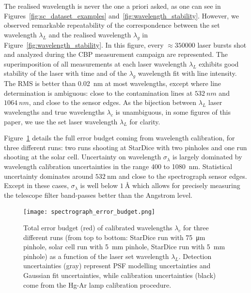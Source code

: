 The realised wavelength is never the one a priori asked, as one can see in Figures~\ref{fig:sc_dataset_examples} and~\ref{fig:wavelength_stability}. However, we observed remarkable repeatability of the correspondence between the set wavelength $\lambda_L$ and the realised wavelength $\lambda_g$ in Figure~\ref{fig:wavelength_stability}. In this figure, every $\approx\num{350000}$ laser bursts shot and analyzed during the CBP measurement campaign are represented. The superimposition of all measurements at each laser wavelength $\lambda_L$ exhibits good stability of the laser with time and of the $\lambda_g$ wavelength fit with line intensity. The RMS is better than \SI{0.02}{\nm} at most wavelengths, except where line determination is ambiguous: close to the contamination lines at $\SI{532}{nm}$ and $\SI{1064}{nm}$, and close to the sensor edges. As the bijection between $\lambda_L$ laser wavelengths and true wavelengths $\lambda_c$ is unambiguous, in some figures of this paper, we use the set laser wavelength $\lambda_L$ for clarity. 

Figure~\ref{fig:wavelength_error_budget} details the full error budget coming from wavelength calibration, for three different runs: two runs shooting at StarDice with two pinholes and one run shooting at the solar cell. Uncertainty on wavelength $\sigma_\lambda$ is largely dominated by wavelength calibration uncertainties in the range 400 to \SI{1080}{\nm}. Statistical uncertainty dominates around $\SI{532}{\nm}$ and close to the spectrograph sensor edges. Except in these cases, $\sigma_\lambda$ is well below $\SI{1}{\angstrom}$ which allows for precisely measuring the telescope filter band-passes better than the Angstrom level.   


\begin{figure}[!h]
\centering
\texttt{[image: spectrograph\_error\_budget.png]}
\caption{Total error budget (red) of calibrated wavelengths $\lambda_c$ for three different runs (from top to bottom: StarDice run with \SI{75}{\um} pinhole, solar cell run with \SI{5}{mm} pinhole, StarDice run with \SI{5}{mm} pinhole) as a function of the laser set wavelength $\lambda_L$. Detection uncertainties (gray) represent PSF modelling uncertainties and Gaussian fit uncertainties, while calibration uncertainties (black) come from the Hg-Ar lamp calibration procedure. }\label{fig:wavelength_error_budget}
\end{figure}

